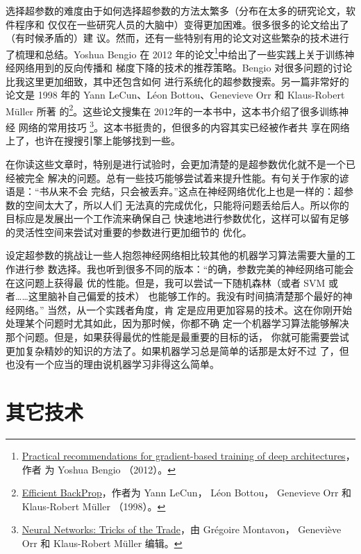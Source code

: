选择超参数的难度由于如何选择超参数的方法太繁多（分布在太多的研究论文，软件程序和
仅仅在一些研究人员的大脑中）变得更加困难。很多很多的论文给出了（有时候矛盾的）建
议。然而，还有一些特别有用的论文对这些繁杂的技术进行了梳理和总结。Yoshua Bengio
在 2012 年的论文\footnote{\href{http://arxiv.org/abs/1206.5533}{Practical
    recommendations for gradient-based training of deep architectures}，作者
  为 Yoshua Bengio （2012）。}中给出了一些实践上关于训练神经网络用到的反向传播和
梯度下降的技术的推荐策略。Bengio 对很多问题的讨论比我这里更加细致，其中还包含如何
进行系统化的超参数搜索。另一篇非常好的论文是 1998 年的 Yann LeCun、Léon
Bottou、Genevieve Orr 和 Klaus-Robert Müller 所著
的\footnote{\href{http://yann.lecun.com/exdb/publis/pdf/lecun-98b.pdf}{Efficient
    BackProp}，作者为 Yann LeCun， Léon Bottou， Genevieve Orr 和 Klaus-Robert
  Müller （1998）。}。这些论文搜集在 2012年的一本书中，这本书介绍了很多训练神经
网络的常用技巧
\footnote{\href{http://www.springer.com/computer/theoretical+computer+science/book/978-3-642-35288-1}{Neural
    Networks: Tricks of the Trade}，由 Grégoire Montavon， Geneviève
  Orr 和 Klaus-Robert Müller 编辑。}。这本书挺贵的，但很多的内容其实已经被作者共
享在网络上了，也许在搜搜引擎上能够找到一些。

在你读这些文章时，特别是进行试验时，会更加清楚的是超参数优化就不是一个已经被完全
解决的问题。总有一些技巧能够尝试着来提升性能。有句关于作家的谚语是：“书从来不会
完结，只会被丢弃。”这点在神经网络优化上也是一样的：超参数的空间太大了，所以人们
无法真的完成优化，只能将问题丢给后人。所以你的目标应是发展出一个工作流来确保自己
快速地进行参数优化，这样可以留有足够的灵活性空间来尝试对重要的参数进行更加细节的
优化。

设定超参数的挑战让一些人抱怨神经网络相比较其他的机器学习算法需要大量的工作进行参
数选择。我也听到很多不同的版本：“的确，参数完美的神经网络可能会在这问题上获得最
优的性能。但是，我可以尝试一下随机森林（或者 SVM 或者……这里脑补自己偏爱的技术）
也能够工作的。我没有时间搞清楚那个最好的神经网络。” 当然，从一个实践者角度，肯
定是应用更加容易的技术。这在你刚开始处理某个问题时尤其如此，因为那时候，你都不确
定一个机器学习算法能够解决那个问题。但是，如果获得最优的性能是最重要的目标的话，
你就可能需要尝试更加复杂精妙的知识的方法了。如果机器学习总是简单的话那是太好不过
了，但也没有一个应当的理由说机器学习非得这么简单。

\section{其它技术}
\label{sec:other_techniques}


